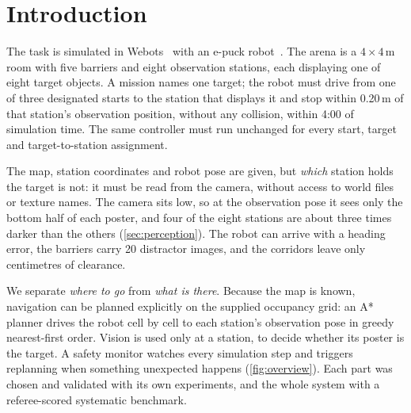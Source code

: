 \section{Introduction}
\label{sec:intro}

The task is simulated in Webots~\cite{michel2004webots} with an e-puck robot~\cite{mondada2009epuck}. The arena is a $4{\times}4$\,m room with five barriers and eight observation stations, each displaying one of eight target objects. A mission names one target; the robot must drive from one of three designated starts to the station that displays it and stop within 0.20\,m of that station's observation position, without any collision, within 4:00 of simulation time. The same controller must run unchanged for every start, target and target-to-station assignment.

 The map, station coordinates and robot pose are given, but \emph{which} station holds the target is not: it must be read from the camera, without access to world files or texture names. The camera sits low, so at the observation pose it sees only the bottom half of each poster, and four of the eight stations are about three times darker than the others (\cref{sec:perception}). The robot can arrive with a heading error, the barriers carry 20 distractor images, and the corridors leave only centimetres of clearance.

 We separate \emph{where to go} from \emph{what is there}. Because the map is known, navigation can be planned explicitly on the supplied occupancy grid: an A* planner drives the robot cell by cell to each station's observation pose in greedy nearest-first order. Vision is used only at a station, to decide whether its poster is the target. A safety monitor watches every simulation step and triggers replanning when something unexpected happens (\cref{fig:overview}). Each part was chosen and validated with its own experiments, and the whole system with a referee-scored systematic benchmark.

